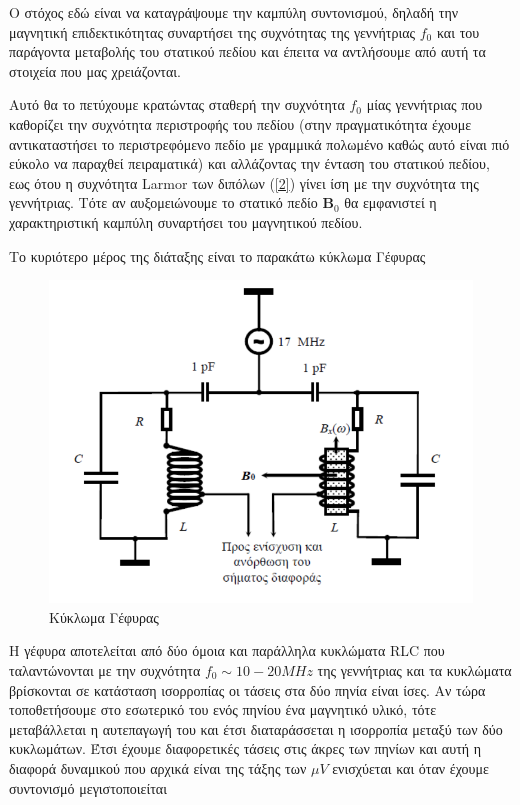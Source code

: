 \documentclass[a4paper]{article}
\begin{document}
 Ο στόχος εδώ είναι να καταγράψουμε την καμπύλη συντονισμού, δηλαδή την μαγνητική επιδεκτικότητας συναρτήσει της συχνότητας της γεννήτριας $f_0$ και του παράγοντα μεταβολής του στατικού πεδίου και έπειτα να αντλήσουμε από αυτή τα στοιχεία που μας χρειάζονται. 
 
 Αυτό θα το πετύχουμε κρατώντας σταθερή την συχνότητα $f_0$ μίας γεννήτριας που καθορίζει την συχνότητα περιστροφής του πεδίου (στην πραγματικότητα έχουμε αντικαταστήσει το περιστρεφόμενο πεδίο με γραμμικά πολωμένο καθώς αυτό είναι πιό εύκολο να παραχθεί πειραματικά) και αλλάζοντας την ένταση του στατικού πεδίου, εως ότου η συχνότητα Larmor των διπόλων (\ref{2}) γίνει ίση με την συχνότητα της γεννήτριας. Τότε αν αυξομειώνουμε το στατικό πεδίο $\textbf{B}_0$ θα εμφανιστεί η χαρακτηριστική καμπύλη συναρτήσει του μαγνητικού πεδίου. 
 
 Το κυριότερο μέρος της διάταξης είναι το παρακάτω κύκλωμα Γέφυρας 
 
 \begin{figure}[h!]
 	\centering
 	\includegraphics[scale=0.42]{im1.png}
 	\caption{Κύκλωμα Γέφυρας}
 	\label{im1}
 \end{figure}

Η γέφυρα αποτελείται από δύο όμοια και παράλληλα κυκλώματα RLC που ταλαντώνονται με την συχνότητα $f_0\sim10-20MHz$ της γεννήτριας και τα κυκλώματα βρίσκονται σε κατάσταση ισορροπίας οι τάσεις στα δύο πηνία είναι ίσες. Αν τώρα τοποθετήσουμε στο εσωτερικό του ενός πηνίου ένα μαγνητικό υλικό, τότε μεταβάλλεται η αυτεπαγωγή του και έτσι διαταράσσεται η ισορροπία μεταξύ των δύο κυκλωμάτων. Έτσι έχουμε διαφορετικές τάσεις στις άκρες των πηνίων και αυτή η διαφορά δυναμικού που αρχικά είναι της τάξης των $\mu V$ ενισχύεται και όταν έχουμε συντονισμό μεγιστοποιείται
\end{document}
